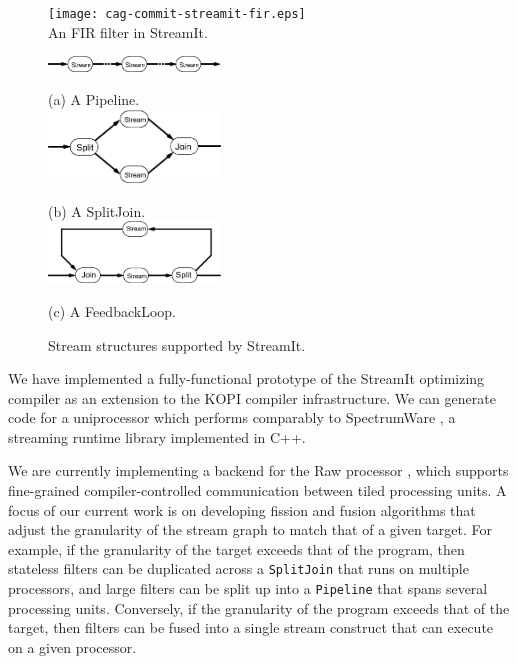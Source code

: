 \begin{figure}[t]
\centering
\begin{minipage}{2.5in}
  \texttt{[image: cag-commit-streamit-fir.eps]}
\\
\caption{\protect\small An FIR filter in StreamIt.~~~~~
\protect\label{fig:commit-streamit-firstreamit}}
\end{minipage}
\begin{minipage}{3in}
\centering
\vspace{10pt}
  \includegraphics[width=1.8in]{cag-commit-streamit-pipeline.eps}

(a) A Pipeline. \\
\vspace{10pt}
  \includegraphics[width=1.8in]{cag-commit-streamit-splitjoin.eps}

(b) A SplitJoin. \\
\vspace{10pt}
  \includegraphics[width=1.8in]{cag-commit-streamit-feedback.eps}

(c) A FeedbackLoop. \\
\caption{\protect\small Stream structures supported by StreamIt.
\protect\label{fig:commit-streamit-structures}
}
\end{minipage}
\vspace{-6pt}
\end{figure}

 We have implemented a fully-functional
prototype of the StreamIt optimizing compiler as an extension to the
KOPI compiler infrastructure.  We can generate code for a uniprocessor
which performs comparably to SpectrumWare \cite{spectrumware}, a
streaming runtime library implemented in C++.

We are currently implementing a backend for the Raw processor
\cite{rawshort}, which supports fine-grained compiler-controlled
communication between tiled processing units.  A focus of our current
work is on developing fission and fusion algorithms that adjust the
granularity of the stream graph to match that of a given target.  For
example, if the granularity of the target exceeds that of the program,
then stateless filters can be duplicated across a {\tt SplitJoin} that
runs on multiple processors, and large filters can be split up into a
{\tt Pipeline} that spans several processing units.  Conversely, if
the granularity of the program exceeds that of the target, then
filters can be fused into a single stream construct that can execute
on a given processor.

